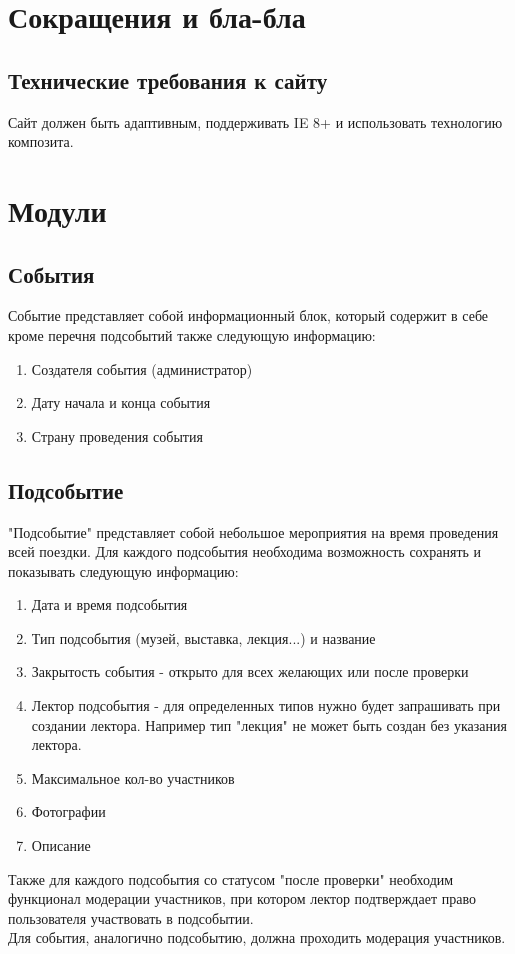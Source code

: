 \documentclass[DIV=calc, paper=a4, fontsize=11pt]{scrartcl} %
\begin{document}
\section{Сокращения и бла-бла}

\subsection{Технические требования к сайту}
Сайт должен быть адаптивным, поддерживать IE 8+ и использовать технологию композита.


\section{Модули}

\subsection{События}
Событие представляет собой информационный блок, который содержит в себе кроме перечня подсобытий также следующую информацию:

    \begin{enumerate}
        \item Создателя события (администратор) 
        \item Дату начала и конца события
        \item Страну проведения события 
    \end{enumerate}
    
\subsection{Подсобытие}
"Подсобытие" представляет собой небольшое мероприятия на время проведения всей поездки. Для каждого подсобытия необходима возможность сохранять и показывать следующую информацию:


    \begin{enumerate}
        \item Дата и время подсобытия
        \item Тип подсобытия (музей, выставка, лекция...) и название
        \item Закрытость события - открыто для всех желающих или после проверки
        \item Лектор подсобытия - для определенных типов нужно будет запрашивать при создании лектора. Например тип "лекция" не может быть создан без указания лектора.
        \item Максимальное кол-во участников
        \item Фотографии
        \item Описание
    \end{enumerate}
Также для каждого подсобытия со статусом "после проверки" необходим функционал модерации участников, при котором лектор  подтверждает право пользователя участвовать в подсобытии.
\\[0.5cm]
Для события, аналогично подсобытию, должна проходить модерация участников.
\end{document}
